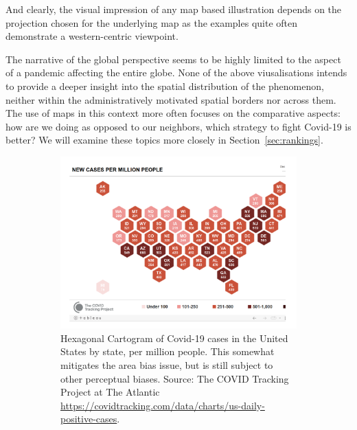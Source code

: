 \documentclass[article]{jdssv}\usepackage[]{graphicx}\usepackage[]{color}
\begin{document}
And clearly, the visual impression of any map based illustration depends on the projection chosen for the underlying map as the examples quite often demonstrate a western-centric viewpoint. 

The narrative of the global perspective seems to be highly limited to the aspect of a pandemic affecting the entire globe. None of the above viusalisations intends to provide a deeper insight into the spatial distribution of the phenomenon, neither within the administratively motivated spatial borders nor across them. The use of maps in this context more often focuses on the comparative aspects: how are we doing as opposed to our neighbors, which strategy to fight Covid-19 is better? We will examine these topics more closely in Section~\ref{sec:rankings}.

\begin{figure}
\centering
\begin{subfigure}[t]{.45\textwidth}
\includegraphics[width=\textwidth]{covid-tracking-hex-cartogram}
\caption{Hexagonal Cartogram of Covid-19 cases in the United States by state, per million people. This somewhat mitigates the area bias issue, but is still subject to other perceptual biases. Source: The COVID Tracking Project at The Atlantic \url{https://covidtracking.com/data/charts/us-daily-positive-cases}.}\label{fig:hex-cartogram}
\end{subfigure}\hfill
\begin{subfigure}[t]{.45\textwidth}

\end{subfigure}
\end{figure}
\end{document}
